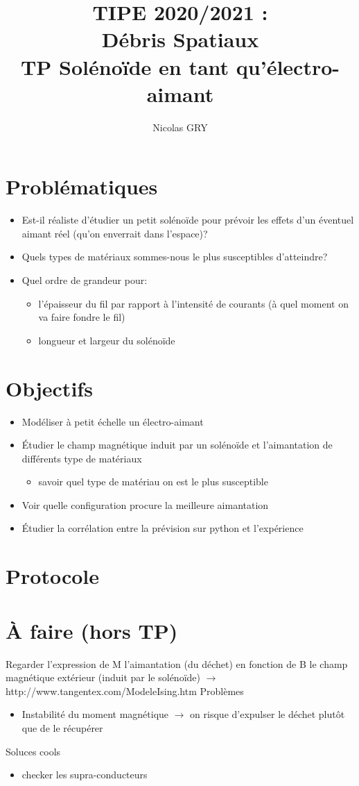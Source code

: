 \documentclass{article}
\author{Nicolas GRY}
\title{TIPE 2020/2021 : \\ Débris Spatiaux
\\ TP Solénoïde en tant qu'électro-aimant}
\begin{document}
\maketitle
\section{Problématiques}
\begin{itemize}
    \item Est-il réaliste d'étudier un petit solénoïde pour prévoir les effets d'un éventuel aimant réel (qu'on enverrait dans l'espace)?
    \item Quels types de matériaux sommes-nous le plus susceptibles d'atteindre?
    \item Quel ordre de grandeur pour:
    \begin{itemize}
        \item l'épaisseur du fil par rapport à l'intensité de courants (à quel moment on va faire fondre le fil)
        \item longueur et largeur du solénoïde
    \end{itemize}
\end{itemize}
\section{Objectifs}
\begin{itemize}
    \item Modéliser à petit échelle un électro-aimant
    \item Étudier le champ magnétique induit par un solénoïde et l'aimantation de différents type de matériaux
    \begin{itemize}
        \item savoir quel type de matériau on est le plus susceptible
    \end{itemize}
    \item Voir quelle configuration procure la meilleure aimantation
    \item Étudier la corrélation entre la prévision sur python et l'expérience
\end{itemize}

\section{Protocole}
\section{À faire (hors TP)}
Regarder l'expression de M l'aimantation (du déchet) en fonction de B le champ magnétique extérieur (induit par le solénoïde) $\to$ http://www.tangentex.com/ModeleIsing.htm
Problèmes
\begin{itemize}
    \item Instabilité du moment magnétique $\to$ on risque d'expulser le déchet plutôt que de le récupérer
\end{itemize}

Soluces cools
\begin{itemize}
    \item checker les supra-conducteurs
\end{itemize}
\end{document}
